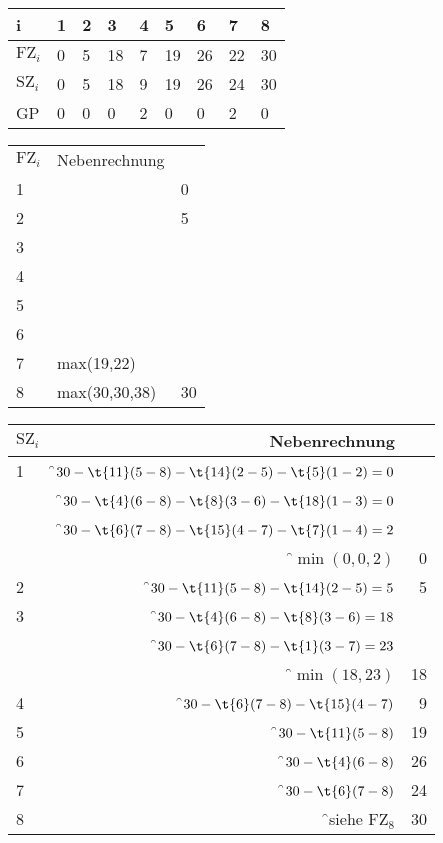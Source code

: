 \documentclass{lehramt-informatik}
\begin{document}
\begin{tabular}{|l|l|l|l|l|l|l|l|l|}
\hline
i             & 1 & 2 & 3  & 4 & 5  & 6  & 7  & 8 \\\hline\hline
$\text{FZ}_i$ & 0 & 5 & 18 & 7 & 19 & 26 & 22 & 30 \\\hline
$\text{SZ}_i$ & 0 & 5 & 18 & 9 & 19 & 26 & 24 & 30 \\\hline
GP            & 0 & 0 & 0  & 2 & 0  & 0  & 2  & 0 \\\hline
\end{tabular}

\bigskip

\begin{tabular}{|l|l|l|}
$\text{FZ}_i$ & Nebenrechnung & \\
1             &  & 0 \\
2             & & 5 \\
3             & & \\
4             & & \\
5             &  & \\
6             & & \\
7             & max(19,22) & \\
8             & max(30,30,38) & 30 \\
\end{tabular}

\bigskip

\begin{tabular}{|l|r|r|}
\hline
$\text{SZ}_i$ & Nebenrechnung & \\
\hline\hline
1             & \f$30 - \t{11}(5-8) - \t{14}(2-5) -\t{5}(1-2) = 0$ & \\
              & \f$30 - \t{4}(6-8) - \t{8}(3-6) - \t{18}(1-3) = 0$ & \\
              & \f$30 - \t{6}(7-8) - \t{15}(4-7) - \t{7}(1-4) = 2$ & \\
              & \f$\min(0,0,2)$ & 0 \\\hline

2             & \f$30 - \t{11}(5-8) - \t{14}(2-5) = 5$ & 5 \\\hline
3             & \f$30 - \t{4}(6-8) - \t{8}(3-6) = 18$  & \\
              & \f$30 - \t{6}(7-8) - \t{1}(3-7) = 23$  & \\
              & \f$\min(18,23)$                        & 18 \\\hline

4             & \f$30 - \t{6}(7-8) - \t{15}(4-7)$      & 9 \\\hline
5             & \f$30 - \t{11}(5-8)$                   & 19 \\\hline
6             & \f$30 - \t{4}(6-8)$                    & 26 \\\hline
7             & \f$30 - \t{6}(7-8)$                    & 24 \\\hline
8             & \f{}siehe $\text{FZ}_8$                & 30 \\\hline
\end{tabular}
\end{document}
